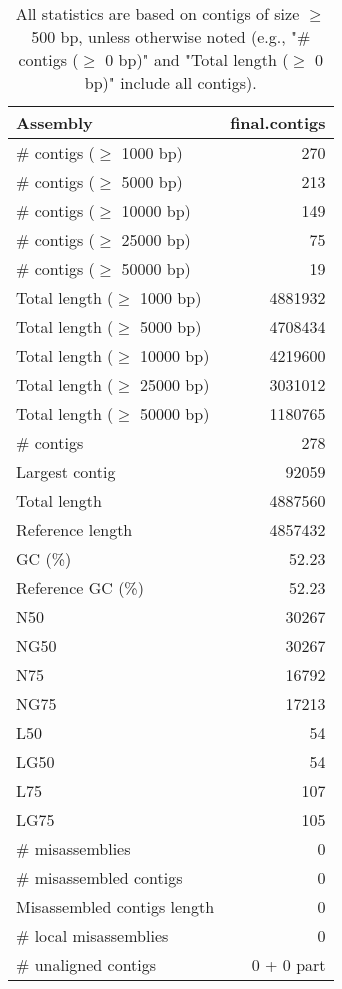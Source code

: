 \documentclass[12pt,a4paper]{article}
\begin{document}
\begin{table}[ht]
\begin{center}
\caption{All statistics are based on contigs of size $\geq$ 500 bp, unless otherwise noted (e.g., "\# contigs ($\geq$ 0 bp)" and "Total length ($\geq$ 0 bp)" include all contigs).}
\begin{tabular}{|l*{1}{|r}|}
\hline
Assembly & final.contigs \\ \hline
\# contigs ($\geq$ 1000 bp) & 270 \\ \hline
\# contigs ($\geq$ 5000 bp) & 213 \\ \hline
\# contigs ($\geq$ 10000 bp) & 149 \\ \hline
\# contigs ($\geq$ 25000 bp) & 75 \\ \hline
\# contigs ($\geq$ 50000 bp) & 19 \\ \hline
Total length ($\geq$ 1000 bp) & 4881932 \\ \hline
Total length ($\geq$ 5000 bp) & 4708434 \\ \hline
Total length ($\geq$ 10000 bp) & 4219600 \\ \hline
Total length ($\geq$ 25000 bp) & 3031012 \\ \hline
Total length ($\geq$ 50000 bp) & 1180765 \\ \hline
\# contigs & 278 \\ \hline
Largest contig & 92059 \\ \hline
Total length & 4887560 \\ \hline
Reference length & 4857432 \\ \hline
GC (\%) & 52.23 \\ \hline
Reference GC (\%) & 52.23 \\ \hline
N50 & 30267 \\ \hline
NG50 & 30267 \\ \hline
N75 & 16792 \\ \hline
NG75 & 17213 \\ \hline
L50 & 54 \\ \hline
LG50 & 54 \\ \hline
L75 & 107 \\ \hline
LG75 & 105 \\ \hline
\# misassemblies & 0 \\ \hline
\# misassembled contigs & 0 \\ \hline
Misassembled contigs length & 0 \\ \hline
\# local misassemblies & 0 \\ \hline
\# unaligned contigs & 0 + 0 part \\ \hline

\end{tabular}
\end{center}
\end{table}
\end{document}

